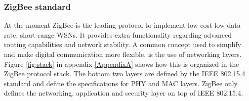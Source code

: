 \subsubsection{ZigBee standard}
At the moment ZigBee is the leading protocol to implement low-cost low-data-rate, short-range WSNs. It provides extra functionality regarding advanced routing capabilities and network stability. A common concept used to simplify and make digital communication more flexible, is the use of networking layers. Figure \ref{fig:stack} in appendix \ref{AppendixA} shows how this is organized in the ZigBee protocol stack.  The bottom two layers are defined by the IEEE 802.15.4 standard and define the specifications for PHY and MAC layers. ZigBee only defines the networking, application and security layer on top of IEEE 802.15.4.\\